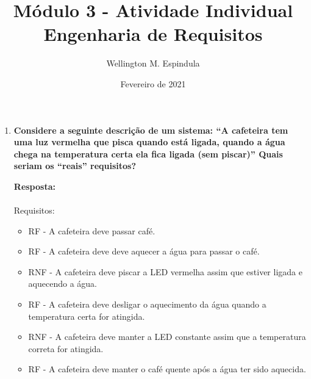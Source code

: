 \documentclass[12pt, a4paper]{article}
\title{Módulo 3 - Atividade Individual \\
  \large Engenharia de Requisitos}
\author{Wellington M. Espindula}
\date{Fevereiro de 2021}
\newcommand{\tb}[1]{\textbf{#1}}
\newcommand{\question}[1]{\item \tb{#1}}
\newcommand{\answer}[1]{\par \tb{Resposta:} #1}
\begin{document}
    \maketitle
    
    \begin{enumerate}[label=\textbf{\arabic*.}]
        \question{Considere a seguinte descrição de um sistema: “A cafeteira tem uma luz vermelha que pisca quando está ligada, quando a água chega na temperatura certa ela fica ligada (sem piscar)” Quais seriam os “reais” requisitos?}
        \answer{ \\ \\
            Requisitos:
            \begin{itemize}
                \item RF - A cafeteira deve passar café.
                \item RF - A cafeteira deve deve aquecer a água para passar o café.
                \item RNF - A cafeteira deve piscar a LED vermelha assim que estiver ligada e aquecendo a água.
                \item RF - A cafeteira deve desligar o aquecimento da água quando a temperatura certa for atingida.
                \item RNF - A cafeteira deve manter a LED constante assim que a temperatura correta for atingida.
                \item RF - A cafeteira deve manter o café quente após a água ter sido aquecida.
            \end{itemize}
        } \newpage
        

\end{enumerate}
\end{document}
